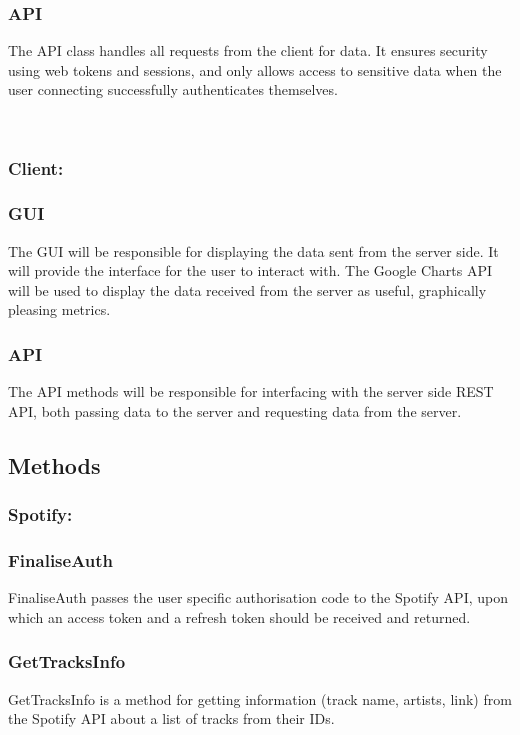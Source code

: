 \documentclass[11pt]{report}
\begin{document}
\subsubsection{API}
The API class handles all requests from the client for data. It ensures security using web tokens and sessions, and only allows access to sensitive data when the user connecting successfully authenticates themselves.  


\leavevmode \\

\subsubsection{Client:}

\hrulefill

\subsubsection{GUI}
The GUI will be responsible for displaying the data sent from the server side. It will provide the interface for the user to interact with. The Google Charts API will be used to display the data received from the server as useful, graphically pleasing metrics.

\subsubsection{API}
The API methods will be responsible for interfacing with the server side REST API, both passing data to the server and requesting data from the server.

\subsection{Methods}

\subsubsection{Spotify:}

\hrulefill

\subsubsection{FinaliseAuth}
FinaliseAuth passes the user specific authorisation code to the Spotify API, upon which an access token and a refresh token should be received and returned.

\subsubsection{GetTracksInfo}
GetTracksInfo is a method for getting information (track name, artists, link) from the Spotify API about a list of tracks from their IDs.
\end{document}
